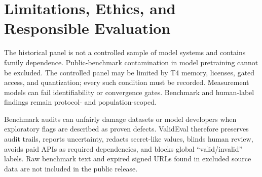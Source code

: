 \section{Limitations, Ethics, and Responsible Evaluation}

The historical panel is not a controlled sample of model systems and contains family dependence.
Public-benchmark contamination in model pretraining cannot be excluded. The controlled panel may be
limited by T4 memory, licenses, gated access, and quantization; every such condition must be recorded.
Measurement models can fail identifiability or convergence gates. Benchmark and human-label findings
remain protocol- and population-scoped.

Benchmark audits can unfairly damage datasets or model developers when exploratory flags are
described as proven defects. ValidEval therefore preserves audit trails, reports uncertainty,
redacts secret-like values, blinds human review, avoids paid APIs as required dependencies, and
blocks global ``valid/invalid'' labels. Raw benchmark text and expired signed URLs found in excluded
source data are not included in the public release.
